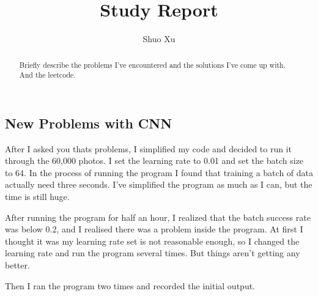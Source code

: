 \documentclass[10pt]{article}
\begin{document}
    \title{Study Report}
    \author{Shuo Xu}
    \maketitle
    \begin{abstract}
        Briefly describe the problems I've encountered and the solutions I've come up with. And the leetcode.
    \end{abstract}

    \begin{center}
        \section*{New Problems with CNN}
    \end{center}
    \begin{flushleft}
        After I asked you thats problems, I simplified my code and decided to run it through the 60,000 photos. I set the learning rate to 0.01 and set the batch size to 64. In the process of running the program I found that training a batch of data actually need three seconds. I've simplified the program as much as I can, but the time is still huge.\vspace{2ex}

        After running the program for half an hour, I realized that the batch success rate was below 0.2, and I realised there was a problem inside the program. At first I thought it was my learning rate set is not reasonable enough, so I changed the learning rate and run the program several times. But things aren't getting any better.\vspace{2ex}

        Then I ran the program two times and recorded the initial output.


\end{flushleft}
\end{document}
